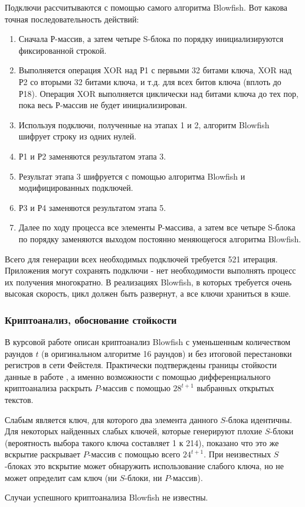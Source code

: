 Подключи рассчитываются с помощью самого алгоритма Blowfish. 
Вот какова точная последовательность действий:
\begin{enumerate}
\item Сначала Р-массив, а затем четыре S-блока по порядку инициализируются 
    фиксированной строкой.
\item Выполняется операция XOR над Р1 с первыми 32 битами ключа, 
    XOR над Р2 со вторыми 32 битами ключа, и т.д. для всех битов 
    ключа (вплоть до Р18). Операция XOR выполняется циклически над 
    битами ключа до тех пор, пока весь Р-массив не будет инициализирован.
\item Используя подключи, полученные на этапах 1 и 2, алгоритм 
    Blowfish шифрует строку из одних нулей.
\item Р1 и Р2 заменяются результатом этапа 3.
\item Результат этапа 3 шифруется с помощью алгоритма Blowfish 
    и модифицированных подключей.
\item Р3 и Р4 заменяются результатом этапа 5.
\item Далее по ходу процесса все элементы Р-массива, а затем 
    все четыре S-блока по порядку заменяются выходом постоянно меняющегося 
    алгоритма Blowfish.
\end{enumerate}

Всего для генерации всех необходимых подключей требуется 521 
итерация. Приложения могут сохранять подключи - нет необходимости 
выполнять процесс их получения многократно.
В реализациях Blowfish, в которых требуется очень высокая скорость,
цикл должен быть развернут, а все ключи храниться в кэше.

\subsubsection{Криптоанализ, обоснование стойкости}

В курсовой работе описан криптоанализ Blowfish с уменьшенным 
количеством раундов $t$ (в оригинальном алгоритме 16 раундов) 
и без итоговой перестановки регистров в сети Фейстеля. 
Практически подтверждены границы
стойкости данные в работе \cite{vaudenay-blowfish}, а именно 
возможности с помощью дифференциального криптоанализа раскрыть 
$P$-массив с помощью $28^{t + 1}$ выбранных открытых текстов. 

Слабым является ключ, для которого 
два элемента данного $S$-блока идентичны.
Для некоторых найденных слабых ключей, которые 
генерируют плохие $S$-блоки 
(вероятность выбора такого ключа составляет 1 к 214), 
показано что это же вскрытие раскрывает 
$P$-массив с помощью всего $24^{t + 1}$. При неизвестных $S$-блоках это 
вскрытие может обнаружить использование слабого ключа, но не 
может определит сам ключ (ни $S$-блоки, ни $P$-массив).

Случаи успешного криптоанализа Blowfish не известны.
